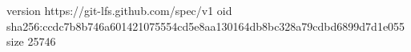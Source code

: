 version https://git-lfs.github.com/spec/v1
oid sha256:ccdc7b8b746a601421075554cd5e8aa130164db8bc328a79cdbd6899d7d1e055
size 25746
